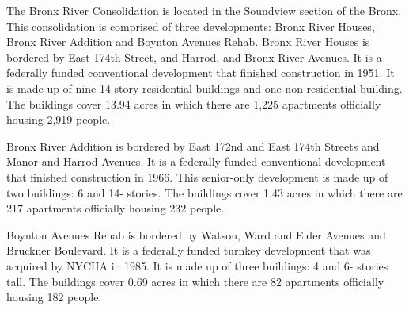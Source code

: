   

The Bronx River Consolidation is located in the Soundview section of the Bronx. This consolidation is comprised of three developments: Bronx River Houses, Bronx River Addition and Boynton Avenues Rehab. Bronx River Houses is bordered by East 174th Street, and Harrod, and Bronx River Avenues. It is a federally funded conventional development that finished construction in 1951. It is made up of nine 14-story residential buildings and one non-residential building. The buildings cover 13.94 acres in which there are 1,225 apartments officially housing 2,919 people.   

 

Bronx River Addition is bordered by East 172nd and East 174th Streets and Manor and Harrod Avenues. It is a federally funded conventional development that finished construction in 1966. This senior-only development is made up of two buildings: 6 and 14- stories. The buildings cover 1.43 acres in which there are 217 apartments officially housing 232 people.   

Boynton Avenues Rehab is bordered by Watson, Ward and Elder Avenues and Bruckner Boulevard. It is a federally funded turnkey development that was acquired by NYCHA in 1985. It is made up of three buildings: 4 and 6- stories tall. The buildings cover 0.69 acres in which there are 82 apartments officially housing 182 people.   

 